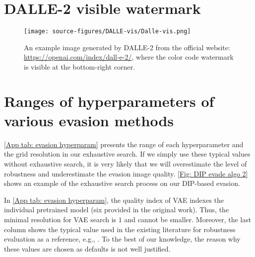 \section{DALLE-2 visible watermark}
\label{App: DALLE-2 Example}
\begin{SCfigure}[][!htbp]
\centering
\texttt{[image: source-figures/DALLE-vis/Dalle-vis.png]}%
\caption{An example image generated by DALLE-2 from the official website: \url{https://openai.com/index/dall-e-2/}, where the color code watermark is visible at the bottom-right corner.}%
\vspace{-0.5em}
\label{Fig App: DALLE 2 Vis}
\end{SCfigure}




% 

\section{Ranges of hyperparameters of various evasion methods}
\label{App: hyperparam}

\cref{App tab: evasion hyperparam} presents the range of each hyperparameter and the grid resolution in our exhaustive search. If we simply use these typical values without exhaustive search, it is very likely that we will overestimate the level of robustness and underestimate the evasion image quality. \cref{Fig: DIP evade algo 2} shows an example of the exhaustive search process on our DIP-based evasion.

In \cref{App tab: evasion hyperparam}, the quality index of VAE indexes the individual pretrained model (six provided in the original work). Thus, the minimal resolution for VAE search is $1$ and cannot be smaller. Moreover, the last column shows the typical value used in the existing literature for robustness evaluation as a reference, e.g., \cite{zhao2023invisible, saberi2023robustness}. To the best of our knowledge, the reason why these values are chosen as defaults is not well justified. 

